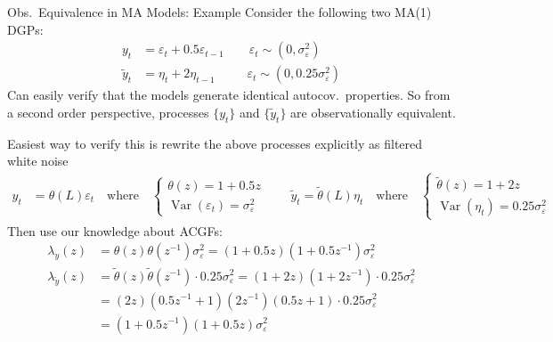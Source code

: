 \documentclass[aspectratio=169, handout]{beamer}
\newcommand{\Var}{\operatorname{Var}}
\begin{document}
{\scriptsize
\begin{frame}{Obs.\ Equivalence in MA Models: Example}
Consider the following two MA(1) DGPs:
\begin{align*}
  y_t &= \varepsilon_t + 0.5 \varepsilon_{t-1}
  \qquad
  \varepsilon_t\sim(0,\sigma^2_\varepsilon)
  \\
  \tilde{y}_t &= \eta_t + 2\eta_{t-1}
  \qquad
  \;\;
  \varepsilon_t\sim(0,0.25\sigma^2_\varepsilon)
\end{align*}
Can easily verify that the models generate \alert{identical}
autocov.\ properties.
So from a \alert{second order perspective}, processes $\{y_t\}$ and
$\{\tilde{y}_t\}$ are \alert{observationally equivalent}.

\pause
Easiest way to verify this is \alert{rewrite} the above processes
explicitly as \alert{filtered white noise}
\begin{align*}
  y_t &= \theta(L)\varepsilon_t
  \quad\text{where}\quad
  \begin{cases}
    \theta(z) = 1+0.5z \\
    \Var(\varepsilon_t) = \sigma^2_\varepsilon
  \end{cases}
  \qquad
  \tilde{y}_t = \tilde{\theta}(L)\eta_t
  \quad\text{where}\quad
  \begin{cases}
    \tilde{\theta}(z) = 1+2z \\
    \Var(\eta_t) = 0.25 \sigma^2_\varepsilon
  \end{cases}
\end{align*}
\pause
Then use our knowledge about ACGFs:
\begin{align*}
  \lambda_y(z)
  &=
  \theta(z)\theta(z^{-1})\sigma^2_\varepsilon
  =
  (1+0.5z)(1+0.5z^{-1})
  \sigma^2_\varepsilon
  \\
  \lambda_{\tilde{y}}(z)
  &=
  \tilde{\theta}(z)\tilde{\theta}(z^{-1})\cdot 0.25\sigma^2_\varepsilon
  =
  (1+2z)(1+2z^{-1})\cdot 0.25\sigma^2_\varepsilon
  \\
  &=
  (2z)(0.5z^{-1}+1)(2z^{-1})(0.5z+1)\cdot 0.25\sigma^2_\varepsilon
  \\
  &=
  (1+0.5z^{-1})(1+0.5z)\sigma^2_\varepsilon
\end{align*}
\end{frame}
}
\end{document}
